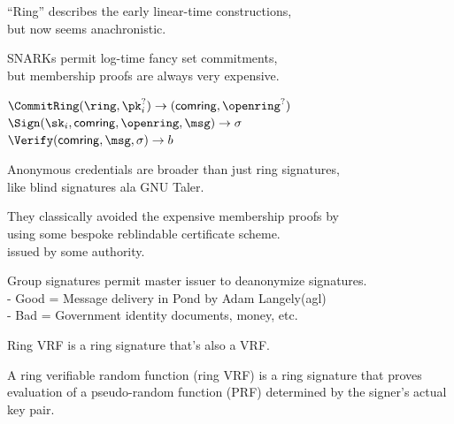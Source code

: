 \documentclass{beamer}
\def\comring{\ensuremath{\mathsf{comring}}\xspace}
\begin{document}
\begin{frame}

``Ring'' describes the early linear-time constructions, \\
\hspace{10pt} but now seems anachronistic.

\bigskip\bigskip

SNARKs permit log-time fancy set commitments, \\
\hspace{10pt} but membership proofs are always very expensive.

\bigskip\bigskip

$\CommitRing(\ring, \pk_i^?)  \rightarrow (\comring, \openring^?)$ \\
$\Sign(\sk_i, \comring,\openring, \msg)\rightarrow \sigma$ \\
$\Verify(\comring,\msg,\sigma) \rightarrow  b$

\end{frame}



\begin{frame}

Anonymous credentials are broader than just ring signatures, \\
\hspace{10pt} like blind signatures ala GNU Taler.

\bigskip\bigskip

They classically avoided the expensive membership proofs by \\
\hspace{10pt}  using some bespoke reblindable certificate scheme. \\
\hspace{10pt}  issued by some authority. 

\bigskip\bigskip

Group signatures permit master issuer to deanonymize signatures. \\
- Good = Message delivery in Pond by Adam Langely(agl) \\
- Bad = Government identity documents, money, etc.

\end{frame}



\begin{frame}

Ring VRF is a ring signature that's also a VRF.

\bigskip\bigskip 

A ring verifiable random function (ring VRF) is a ring signature that proves evaluation of a pseudo-random function (PRF) determined by the signer's actual key pair.

\end{frame}
\end{document}
